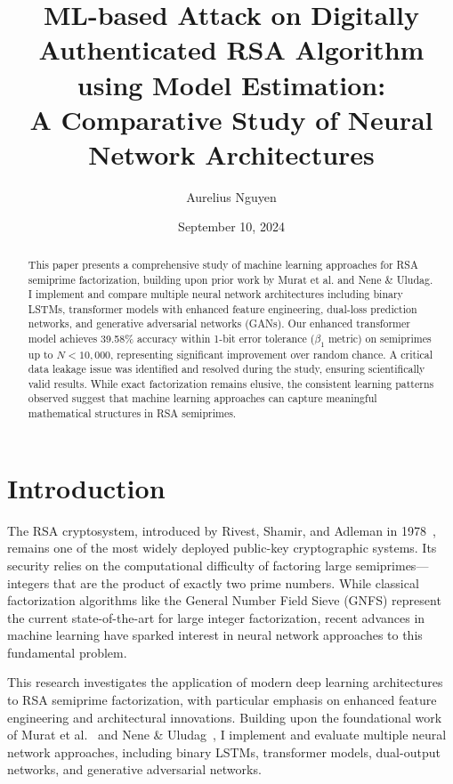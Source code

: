 \documentclass[12pt]{article}
\title{ML-based Attack on Digitally Authenticated RSA Algorithm using Model Estimation: \\
A Comparative Study of Neural Network Architectures}
\author{Aurelius Nguyen}
\date{September 10, 2024}
\begin{document}
\maketitle

\begin{abstract}
This paper presents a comprehensive study of machine learning approaches for RSA semiprime factorization, building upon prior work by Murat et al. and Nene \& Uludag. I implement and compare multiple neural network architectures including binary LSTMs, transformer models with enhanced feature engineering, dual-loss prediction networks, and generative adversarial networks (GANs). Our enhanced transformer model achieves 39.58\% accuracy within 1-bit error tolerance ($\beta_1$ metric) on semiprimes up to $N < 10,000$, representing significant improvement over random chance. A critical data leakage issue was identified and resolved during the study, ensuring scientifically valid results. While exact factorization remains elusive, the consistent learning patterns observed suggest that machine learning approaches can capture meaningful mathematical structures in RSA semiprimes.
\end{abstract}

\section{Introduction}

The RSA cryptosystem, introduced by Rivest, Shamir, and Adleman in 1978~\cite{rivest1978method}, remains one of the most widely deployed public-key cryptographic systems. Its security relies on the computational difficulty of factoring large semiprimes—integers that are the product of exactly two prime numbers. While classical factorization algorithms like the General Number Field Sieve (GNFS) represent the current state-of-the-art for large integer factorization, recent advances in machine learning have sparked interest in neural network approaches to this fundamental problem.

This research investigates the application of modern deep learning architectures to RSA semiprime factorization, with particular emphasis on enhanced feature engineering and architectural innovations. Building upon the foundational work of Murat et al.~\cite{murat2020integer} and Nene \& Uludag~\cite{nene2022machine}, I implement and evaluate multiple neural network approaches, including binary LSTMs, transformer models, dual-output networks, and generative adversarial networks.
\end{document}
